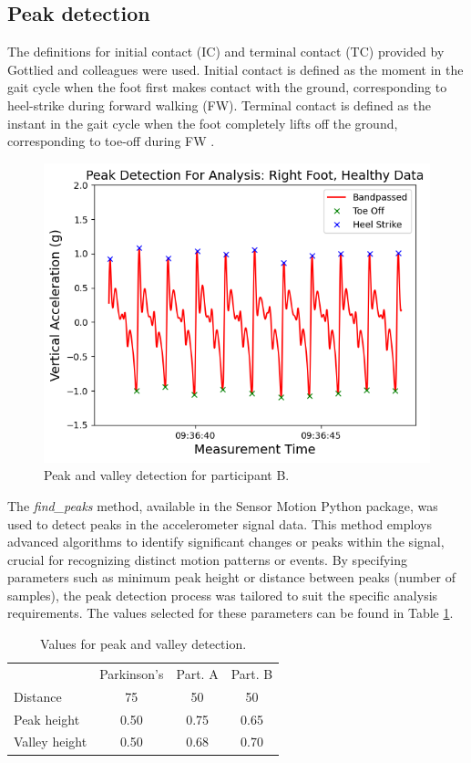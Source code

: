 \subsection{Peak detection}
The definitions for initial contact (IC) and terminal contact (TC) provided by Gottlied and colleagues were used. Initial contact is defined as the moment in the gait cycle when the foot first makes contact with the ground, corresponding to heel-strike during forward walking (FW). Terminal contact is defined as the instant in the gait cycle when the foot completely lifts off the ground, corresponding to toe-off during FW \cite{gottlieb_agreement_2020}.
\begin{figure}[h]
	\centering
	\includegraphics[width=\linewidth]{Figures/peak_detection.png}
	\caption{Peak and valley detection for participant B.}
	\label{fig:peak_detection}
\end{figure}
The \emph{find\_peaks} method, available in the Sensor Motion Python package, was used to detect peaks in the accelerometer signal data. This method employs advanced algorithms to identify significant changes or peaks within the signal, crucial for recognizing distinct motion patterns or events. By specifying parameters such as minimum peak height or distance between peaks (number of samples), the peak detection process was tailored to suit the specific analysis requirements. The values selected for these parameters can be found in Table \ref{tab:peak_values}.
\begin{table}[H] %
	\caption{Values for peak and valley detection.}
	\centering %
	\begin{tabularx}{\linewidth}{l|c|c|c|} %
		\toprule
		& Parkinson's  & Part. A & Part. B \\
		\cmidrule(r){2-4}
		Distance & 75 & 50 & 50\\
		Peak height& 0.50 & 0.75 & 0.65\\
		Valley height & 0.50 & 0.68 & 0.70\\
		\bottomrule
	\end{tabularx}
	\label{tab:peak_values}
\end{table} 


